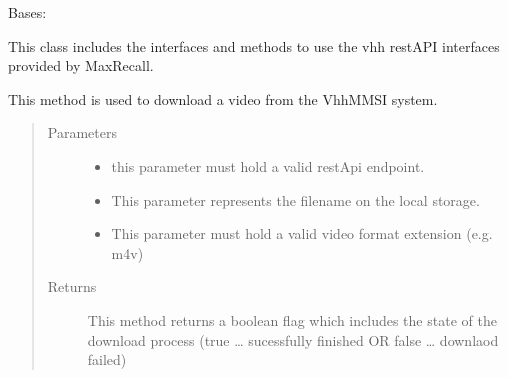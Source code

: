 \documentclass[letterpaper,10pt,english,openany,oneside]{sphinxmanual}
\begin{document}
\begin{fulllineitems}
\label{\detokenize{VhhRestApi:VhhRestApi.VhhRestApi}}
Bases: 

This class includes the interfaces and methods to use the vhh restAPI interfaces provided by MaxRecall.

\begin{fulllineitems}
\label{\detokenize{VhhRestApi:VhhRestApi.VhhRestApi.downloadVideo}}
This method is used to download a video from the Vhh\sphinxhyphen{}MMSI system.
\begin{quote}\begin{description}
\item[{Parameters}] \leavevmode\begin{itemize}
\item {} 
 \textendash{} this parameter must hold a valid restApi endpoint.

\item {} 
 \textendash{} This parameter represents the filename on the local storage.

\item {} 
 \textendash{} This parameter must hold a valid video format extension (e.g. m4v)

\end{itemize}

\item[{Returns}] \leavevmode
This method returns a boolean flag which includes the state of the download process (true … sucessfully finished OR false … downlaod failed)

\end{description}\end{quote}

\end{fulllineitems}



\end{fulllineitems}
\end{document}
